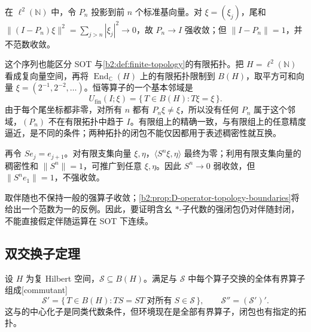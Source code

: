 在 \(\ell^2(\mathbb N)\) 中，令 \(P_n\) 投影到前 \(n\) 个标准基向量。对 \(\xi=(\xi_j)\)，尾和 \(\bigl\lVert(I-P_n)\xi\bigr\rVert^2=\sum_{j>n}|\xi_j|^2\to0\)，故 \(P_n\to I\) 强收敛；但 \(\|I-P_n\|=1\)，并不范数收敛。

\ProseParagraphBreak
这个序列也能区分 SOT 与\cref{b2:def:finite-topology}的有限拓扑。把 \(H=\ell^2(\mathbb N)\) 看成复向量空间，再将 \(\operatorname{End}_{\mathbb C}(H)\) 上的有限拓扑限制到 \(B(H)\)，取平方可和向量 \(\xi=(2^{-1},2^{-2},\ldots)\)。恒等算子的一个基本邻域是
\[
	U_{\mathrm{fin}}(I;\xi)=\bigl\{\,T\in B(H):T\xi=\xi\,\bigr\}.
\]
由于每个尾坐标都非零，对所有 \(n\) 都有 \(P_n\xi\ne\xi\)，所以没有任何 \(P_n\) 属于这个邻域，\((P_n)\) 不在有限拓扑中趋于 \(I\)。有限组上的精确一致，与有限组上的任意精度逼近，是不同的条件；两种拓扑的闭包不能仅因都用于表述稠密性就互换。

\ProseParagraphBreak
再令 \(S e_j=e_{j+1}\)。对有限支集向量 \(\xi,\eta\)，\(\langle S^n\xi,\eta\rangle\) 最终为零；利用有限支集向量的稠密性和 \(\|S^n\|=1\)，可推广到任意 \(\xi,\eta\)。因此 \(S^n\to0\) 弱收敛，但 \(\|S^n e_1\|=1\)，不强收敛。

\ProseParagraphBreak
取伴随也不保持一般的强算子收敛；\cref{b2:prop:D-operator-topology-boundaries}将给出一个范数为一的反例。因此，要证明含幺 \(*\)-子代数的强闭包仍对伴随封闭，不能直接假定伴随运算在 SOT 下连续。

\subsection{双交换子定理}
\label{b2:subsec:D04:02}

设 \(H\) 为复 Hilbert 空间，\(\mathcal S\subseteq B(H)\)。满足与 \(\mathcal S\) 中每个算子交换的全体有界算子组成[commutant]
\[
	\mathcal S'=\bigl\{\,T\in B(H):TS=ST\;\text{对所有}\;S\in\mathcal S\,\bigr\}, \qquad \mathcal S''=(\mathcal S')'.
\]
这与的中心化子是同类代数条件，但环境现在是全部有界算子，闭包也有指定的拓扑。

